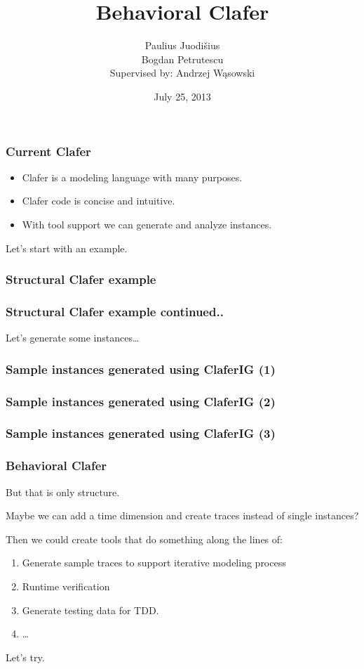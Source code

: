 \documentclass[xcolor=dvipsnames,mathserif,12pt,backend=biber]{beamer}
\title[Discussion ]{Behavioral Clafer}
\author[Paulius Juodi\v{s}ius]{Paulius Juodi\v{s}ius\\ Bogdan Petrutescu\\ {\small Supervised by: Andrzej W\k{a}sowski}}
\date{July 25, 2013}
\begin{document}
  \begin{frame}
    \titlepage
  \end{frame}

  \begin{frame}
    \frametitle{Current Clafer}
    \begin{itemize}
      \item Clafer is a modeling language with many purposes.
      \item Clafer code is concise and intuitive.
      \item With tool support we can generate and analyze instances.
    \end{itemize} 
    Let's start with an example.
  \end{frame}

  \begin{frame}
    \frametitle{Structural Clafer example}
    
  \end{frame}

  \begin{frame}
    \frametitle{Structural Clafer example continued..}
    
    Let's generate some instances\dots
  \end{frame}

  \begin{frame}
    \frametitle{Sample instances generated using ClaferIG (1)}
    
  \end{frame} 

  \begin{frame}
    \frametitle{Sample instances generated using ClaferIG (2)}
    
  \end{frame} 

  \begin{frame}
    \frametitle{Sample instances generated using ClaferIG (3)}
    
  \end{frame} 

  \begin{frame}
    \frametitle{Behavioral Clafer}
    But that is only structure. 

    Maybe we can add a time dimension and create traces instead of single instances?

    Then we could create tools that do something along the lines of:
    \begin{enumerate}
      \item Generate sample traces to support iterative modeling process
      \item Runtime verification
      \item Generate testing data for TDD.
      \item \dots
    \end{enumerate} 

    Let's try.
  \end{frame}
\end{document}
